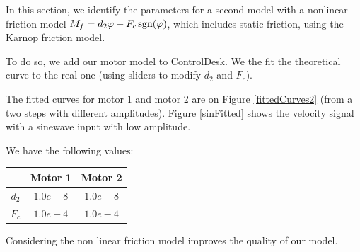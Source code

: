 In this section, we identify the parameters for a second model with a nonlinear friction model $M_f = d_2 \varphi + F_c \mathop{\rm sgn}\nolimits(\varphi)$, which includes static friction, using the Karnop friction model.


To do so, we add our motor model to ControlDesk. We the fit the theoretical curve to the real one (using sliders to modify $d_2$ and $F_c$).

The fitted curves for motor 1 and motor 2 are on Figure \ref{fittedCurves2} (from a two steps with different amplitudes). Figure \ref{sinFitted} shows the velocity signal with a sinewave input with low amplitude.

We have the following values:


\begin{center}
\begin{tabular}{|c|c|c|}
 \hline
 & Motor 1 & Motor 2 \\
 \hline 
 $d_2$ & $1.0e-8$ & $1.0e-8$ \\ 
 \hline 
 $F_c$ & $1.0e-4$ & $1.0e-4$  \\
 \hline
\end{tabular}
\end{center}


Considering the non linear friction model improves the quality of our model.

